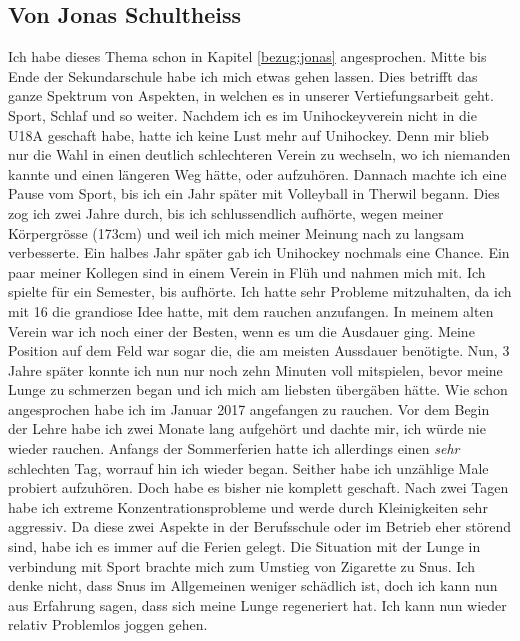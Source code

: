\subsection{Von Jonas Schultheiss}
\authortoc{\jonas}{\subsectionident}
\label{vorher_jonas}
Ich habe dieses Thema schon in Kapitel \ref{bezug:jonas} angesprochen.
\newline
Mitte bis Ende der Sekundarschule habe ich mich etwas gehen lassen. Dies betrifft das ganze Spektrum von Aspekten, in welchen es in unserer Vertiefungsarbeit geht. Sport, Schlaf und so weiter. Nachdem ich es im Unihockeyverein nicht in die U18A geschaft habe, hatte ich keine Lust mehr auf Unihockey. Denn mir blieb nur die Wahl in einen deutlich schlechteren Verein zu wechseln, wo ich niemanden kannte und einen längeren Weg hätte, oder aufzuhören. Dannach machte ich eine Pause vom Sport, bis ich ein Jahr später mit Volleyball in Therwil begann. Dies zog ich zwei Jahre durch, bis ich schlussendlich aufhörte, wegen meiner Körpergrösse (173cm) und weil ich mich meiner Meinung nach zu langsam verbesserte. Ein halbes Jahr später gab ich Unihockey nochmals eine Chance. Ein paar meiner Kollegen sind in einem Verein in Flüh und nahmen mich mit. Ich spielte für ein Semester, bis aufhörte. Ich hatte sehr Probleme mitzuhalten, da ich mit 16 die grandiose Idee hatte, mit dem rauchen anzufangen. In meinem alten Verein war ich noch einer der Besten, wenn es um die Ausdauer ging. Meine Position auf dem Feld war sogar die, die am meisten Aussdauer benötigte. Nun, 3 Jahre später konnte ich nun nur noch zehn Minuten voll mitspielen, bevor meine Lunge zu schmerzen began und ich mich am liebsten übergäben hätte.
\newline
Wie schon angesprochen habe ich im Januar 2017 angefangen zu rauchen. Vor dem Begin der Lehre habe ich zwei Monate lang aufgehört und dachte mir, ich würde nie wieder rauchen. Anfangs der Sommerferien hatte ich allerdings einen \textit{sehr} schlechten Tag, worrauf hin ich wieder began. Seither habe ich unzählige Male probiert aufzuhören. Doch habe es bisher nie komplett geschaft. Nach zwei Tagen habe ich extreme Konzentrationsprobleme und werde durch Kleinigkeiten sehr aggressiv. Da diese zwei Aspekte in der Berufsschule oder im Betrieb eher störend sind, habe ich es immer auf die Ferien gelegt. Die Situation mit der Lunge in verbindung mit Sport brachte mich zum Umstieg von Zigarette zu Snus. Ich denke nicht, dass Snus im Allgemeinen weniger schädlich ist, doch ich kann nun aus Erfahrung sagen, dass sich meine Lunge regeneriert hat. Ich kann nun wieder relativ Problemlos joggen gehen.

